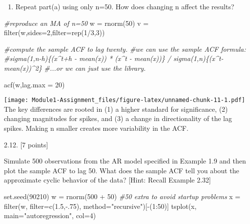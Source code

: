 \documentclass[
]{article}
\newenvironment{Shaded}{\begin{snugshade}}{\end{snugshade}}
\newcommand{\AttributeTok}[1]{\textcolor[rgb]{0.77,0.63,0.00}{#1}}
\newcommand{\CommentTok}[1]{\textcolor[rgb]{0.56,0.35,0.01}{\textit{#1}}}
\newcommand{\DecValTok}[1]{\textcolor[rgb]{0.00,0.00,0.81}{#1}}
\newcommand{\FloatTok}[1]{\textcolor[rgb]{0.00,0.00,0.81}{#1}}
\newcommand{\FunctionTok}[1]{\textcolor[rgb]{0.00,0.00,0.00}{#1}}
\newcommand{\NormalTok}[1]{#1}
\newcommand{\OtherTok}[1]{\textcolor[rgb]{0.56,0.35,0.01}{#1}}
\newcommand{\SpecialCharTok}[1]{\textcolor[rgb]{0.00,0.00,0.00}{#1}}
\newcommand{\StringTok}[1]{\textcolor[rgb]{0.31,0.60,0.02}{#1}}
\providecommand{\tightlist}{%
  \setlength{\itemsep}{0pt}\setlength{\parskip}{0pt}}
\begin{document}
\begin{enumerate}
\def\labelenumi{\alph{enumi})}
\setcounter{enumi}{1}
\tightlist
\item
  Repeat part(a) using only n=50. How does changing n affect the
  results?
\end{enumerate}

\begin{Shaded}
\begin{Highlighting}[]
\CommentTok{\#reproduce an MA of n=50}
\NormalTok{w }\OtherTok{=} \FunctionTok{rnorm}\NormalTok{(}\DecValTok{50}\NormalTok{)}
\NormalTok{v }\OtherTok{=} \FunctionTok{filter}\NormalTok{(w,}\AttributeTok{sides=}\DecValTok{2}\NormalTok{,}\AttributeTok{filter=}\FunctionTok{rep}\NormalTok{(}\DecValTok{1}\SpecialCharTok{/}\DecValTok{3}\NormalTok{,}\DecValTok{3}\NormalTok{))}

\CommentTok{\#compute the sample ACF to lag twenty.}
\CommentTok{\#we can use the sample ACF formula:}
\CommentTok{\#sigma(1,n{-}h)\{(x\^{}t+h {-} mean(x)) * (x\^{}t {-} mean(x))\} / sigma(1,n)\{(x\^{}t{-}mean(x))\^{}2\}}
\CommentTok{\#...or we can just use the library.}

\FunctionTok{acf}\NormalTok{(w,}\AttributeTok{lag.max =} \DecValTok{20}\NormalTok{)}
\end{Highlighting}
\end{Shaded}

\texttt{[image: Module1-Assignment\_files/figure-latex/unnamed-chunk-11-1.pdf]}
The key differences are rooted in (1) a higher standard for
significance, (2) changing magnitudes for spikes, and (3) a change in
directionality of the lag spikes. Making n smaller creates more
variability in the ACF.

2.12. {[}7 points{]}

Simulate 500 observations from the AR model specified in Example 1.9 and
then plot the sample ACF to lag 50. What does the sample ACF tell you
about the approximate cyclic behavior of the data? {[}Hint: Recall
Example 2.32{]}

\begin{Shaded}
\begin{Highlighting}[]
\FunctionTok{set.seed}\NormalTok{(}\DecValTok{90210}\NormalTok{)  }
\NormalTok{w }\OtherTok{=} \FunctionTok{rnorm}\NormalTok{(}\DecValTok{500} \SpecialCharTok{+} \DecValTok{50}\NormalTok{) }
\CommentTok{\#50 extra to avoid startup problems  }
\NormalTok{x }\OtherTok{=} \FunctionTok{filter}\NormalTok{(w, }\AttributeTok{filter=}\FunctionTok{c}\NormalTok{(}\FloatTok{1.5}\NormalTok{,}\SpecialCharTok{{-}}\NormalTok{.}\DecValTok{75}\NormalTok{), }\AttributeTok{method=}\StringTok{"recursive"}\NormalTok{)[}\SpecialCharTok{{-}}\NormalTok{(}\DecValTok{1}\SpecialCharTok{:}\DecValTok{50}\NormalTok{)]  }
\FunctionTok{tsplot}\NormalTok{(x, }\AttributeTok{main=}\StringTok{"autoregression"}\NormalTok{, }\AttributeTok{col=}\DecValTok{4}\NormalTok{)}
\end{Highlighting}
\end{Shaded}
\end{document}
